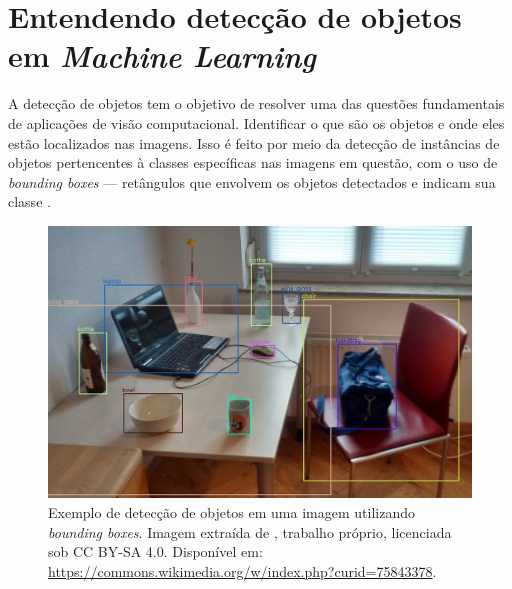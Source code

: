 \section{Entendendo detecção de objetos em \emph{Machine Learning}}
A detecção de objetos tem o objetivo de resolver uma das questões fundamentais de aplicações de visão computacional. Identificar o que são os objetos e onde eles estão localizados nas imagens. Isso é feito por meio da detecção de instâncias de objetos pertencentes à classes específicas nas imagens em questão, com o uso de \emph{bounding boxes} --- retângulos que envolvem os objetos detectados e indicam sua classe \citep{Zou2019Object}.

\begin{figure}[htb!]
    \centering
    \includegraphics[width=0.8\linewidth]{images/bounding_boxes.png}
    \caption{\label{fig:bounding_boxes} Exemplo de detecção de objetos em uma imagem utilizando \emph{bounding boxes}. Imagem extraída de \citeauthor{MTheiler}, trabalho próprio, licenciada sob CC BY-SA 4.0. Disponível em: \url{https://commons.wikimedia.org/w/index.php?curid=75843378}.}
\end{figure}

